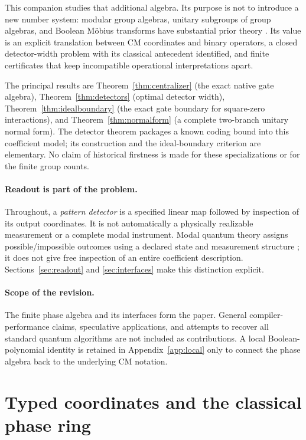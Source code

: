 \documentclass[11pt,a4paper]{article}
\theoremstyle{definition}\newtheorem{definition}[theorem]{Definition}
\theoremstyle{remark}\newtheorem{remark}[theorem]{Remark}
\numberwithin{equation}{section}
\begin{document}
This companion studies that additional algebra. Its purpose is not to introduce a new number system: modular group algebras, unitary subgroups of group algebras, and Boolean M\"obius transforms have substantial prior theory \cite{BaloghLaver,Barbier}. Its value is an explicit translation between CM coordinates and binary operators, a closed detector-width problem with its classical antecedent identified, and finite certificates that keep incompatible operational interpretations apart.

The principal results are Theorem~\ref{thm:centralizer} (the exact native gate algebra), Theorem~\ref{thm:detectors} (optimal detector width), Theorem~\ref{thm:idealboundary} (the exact gate boundary for square-zero interactions), and Theorem~\ref{thm:normalform} (a complete two-branch unitary normal form). The detector theorem packages a known coding bound into this coefficient model; its construction and the ideal-boundary criterion are elementary. No claim of historical firstness is made for these specializations or for the finite group counts.

\paragraph{Readout is part of the problem.}
Throughout, a \emph{pattern detector} is a specified linear map followed by inspection of its output coordinates. It is not automatically a physically realizable measurement or a complete modal instrument. Modal quantum theory assigns possible/impossible outcomes using a declared state and measurement structure \cite{Modal,Almost}; it does not give free inspection of an entire coefficient description. Sections~\ref{sec:readout} and \ref{sec:interfaces} make this distinction explicit.

\paragraph{Scope of the revision.}
The finite phase algebra and its interfaces form the paper. General compiler-performance claims, speculative applications, and attempts to recover all standard quantum algorithms are not included as contributions. A local Boolean-polynomial identity is retained in Appendix~\ref{app:local} only to connect the phase algebra back to the underlying CM notation.

\section{Typed coordinates and the classical phase ring}\label{sec:ring}
\end{document}
